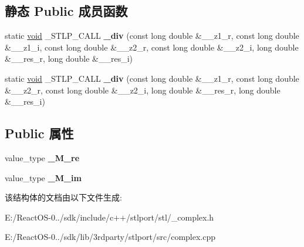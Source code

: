 \subsection*{静态 Public 成员函数}
\begin{DoxyCompactItemize}
\item 
\mbox{\label{structcomplex_3_01long_01double_01_4_ad583736ebcd1937d1cf2a1801f060645}} 
static \hyperlink{interfacevoid}{void} \+\_\+\+S\+T\+L\+P\+\_\+\+C\+A\+LL {\bfseries \+\_\+div} (const long double \&\+\_\+\+\_\+z1\+\_\+r, const long double \&\+\_\+\+\_\+z1\+\_\+i, const long double \&\+\_\+\+\_\+z2\+\_\+r, const long double \&\+\_\+\+\_\+z2\+\_\+i, long double \&\+\_\+\+\_\+res\+\_\+r, long double \&\+\_\+\+\_\+res\+\_\+i)
\item 
\mbox{\label{structcomplex_3_01long_01double_01_4_a91ff578243afafefdc8e3741705d9527}} 
static \hyperlink{interfacevoid}{void} \+\_\+\+S\+T\+L\+P\+\_\+\+C\+A\+LL {\bfseries \+\_\+div} (const long double \&\+\_\+\+\_\+z1\+\_\+r, const long double \&\+\_\+\+\_\+z2\+\_\+r, const long double \&\+\_\+\+\_\+z2\+\_\+i, long double \&\+\_\+\+\_\+res\+\_\+r, long double \&\+\_\+\+\_\+res\+\_\+i)
\end{DoxyCompactItemize}
\subsection*{Public 属性}
\begin{DoxyCompactItemize}
\item 
\mbox{\label{structcomplex_3_01long_01double_01_4_acc079164605f278320d3afeffbd6bad8}} 
value\+\_\+type {\bfseries \+\_\+\+M\+\_\+re}
\item 
\mbox{\label{structcomplex_3_01long_01double_01_4_a451ef55c1f6cdcac1e47d0094049428f}} 
value\+\_\+type {\bfseries \+\_\+\+M\+\_\+im}
\end{DoxyCompactItemize}


该结构体的文档由以下文件生成\+:\begin{DoxyCompactItemize}
\item 
E\+:/\+React\+O\+S-\/0../sdk/include/c++/stlport/stl/\+\_\+complex.\+h\item 
E\+:/\+React\+O\+S-\/0../sdk/lib/3rdparty/stlport/src/complex.\+cpp\end{DoxyCompactItemize}
